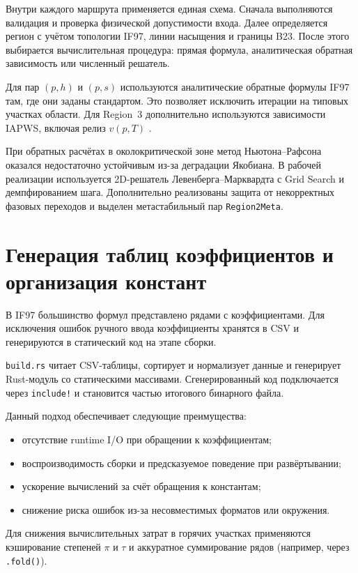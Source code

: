 Внутри каждого маршрута применяется единая схема.
Сначала выполняются валидация и проверка физической допустимости входа.
Далее определяется регион с учётом топологии IF97,
линии насыщения и границы B23.
После этого выбирается вычислительная процедура:
прямая формула, аналитическая обратная зависимость
или численный решатель.

Для пар $(p,h)$ и $(p,s)$
используются аналитические обратные формулы IF97 там,
где они заданы стандартом.
Это позволяет исключить итерации на типовых участках области.
Для Region~3 дополнительно используются зависимости IAPWS,
включая релиз $v(p,T)$ \cite{iapws_vpt_region3}.

При обратных расчётах в околокритической зоне
метод Ньютона--Рафсона оказался недостаточно устойчивым
из-за деградации Якобиана.
В рабочей реализации используется 2D-решатель
Левенберга--Марквардта с Grid Search
и демпфированием шага.
Дополнительно реализованы защита от некорректных фазовых переходов
и выделен метастабильный пар \texttt{Region2Meta}.

\section{Генерация таблиц коэффициентов и организация констант}

В IF97 большинство формул представлено рядами с коэффициентами.
Для исключения ошибок ручного ввода
коэффициенты хранятся в CSV и генерируются в статический код на этапе сборки.

\texttt{build.rs} читает CSV-таблицы,
сортирует и нормализует данные
и генерирует Rust-модуль со статическими массивами.
Сгенерированный код подключается через \texttt{include!}
и становится частью итогового бинарного файла.

Данный подход обеспечивает следующие преимущества:
\begin{itemize}
\item отсутствие runtime I/O при обращении к коэффициентам;  
\item воспроизводимость сборки и предсказуемое поведение при развёртывании;  
\item ускорение вычислений за счёт обращения к константам;  
\item снижение риска ошибок из-за несовместимых форматов или окружения.  
\end{itemize}

Для снижения вычислительных затрат
в горячих участках применяются
кэширование степеней $\pi$ и $\tau$
и аккуратное суммирование рядов (например, через \texttt{.fold()}).

